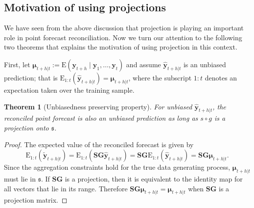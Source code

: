 \documentclass[12pt]{article}
\def\E{\text{E}}
\newtheorem{theo}{Theorem}[section]
\theoremstyle{definition}
\begin{document}
%	
%	
	
	\subsection{Motivation of using projections}
	
	We have seen from the above discussion that projection is playing an important role in point forecast reconciliation. Now we turn our attention to the following two theorems that explains the motivation of using projection in this context. 
	
	First, let $\bm{\mu}_{t+h|t}:=\E(\bm{y}_{t+h}\mid\bm{y}_{1},\dots,\bm{y}_{t})$ and assume $\hat{\bm{y}}_{t+h|t}$ is an unbiased prediction; that is $\E_{1:t}(\hat{\bm{y}}_{t+h|t})=\bm{\mu}_{t+h|t}$, where the subscript $1:t$ denotes an expectation taken over the training sample.
	
	\begin{theo}[Unbiasedness preserving property]
		For unbiased $\hat{\bm{y}}_{t+h|t}$, the reconciled point forecast is also an unbiased prediction as long as $s\circ g$ is a projection onto $\mathfrak{s}$.
	\end{theo}
	\begin{proof}
		The expected value of the reconciled forecast is given by
		\[
		\E_{1:t}(\tilde{\bm{y}}_{t+h|t})
		= \E_{1:t}(\bm{S}\bm{G}\hat{\bm{y}}_{t+h|t})
		= \bm{S}\bm{G}\E_{1:t}(\hat{\bm{y}}_{t+h|t})
		= \bm{S}\bm{G}\bm{\mu}_{t+h|t}.
		\]
		Since the aggregation constraints hold for the true data generating process, $\bm{\mu}_{t+h|t}$ must lie in $\mathfrak{s}$. If $\bm{S}\bm{G}$ is a projection, then it is equivalent to the identity map for all vectors that lie in its range. Therefore $\bm{S}\bm{G}\bm{\mu}_{t+h|t}=\bm{\mu}_{t+h|t}$ when $\bm{S}\bm{G}$ is a projection matrix.
	\end{proof}
\end{document}
